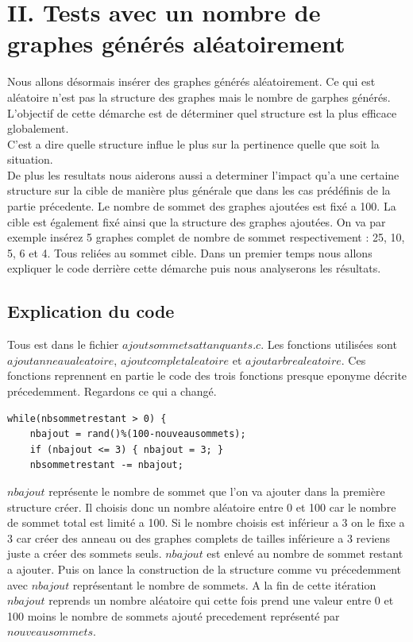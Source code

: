 \documentclass[a4paper,11pt]{article}
\begin{document}
\section{II.	Tests avec un nombre de graphes générés aléatoirement}
	Nous allons désormais insérer des graphes générés aléatoirement. Ce qui est aléatoire n'est pas la structure des graphes mais le nombre de garphes générés.\\
	L'objectif de cette démarche est de déterminer quel structure est la plus efficace globalement.\\
	C'est a dire quelle structure influe le plus sur la pertinence quelle que soit la situation.\\
	De plus les resultats nous aiderons aussi a determiner l'impact qu'a une certaine structure sur la cible de manière plus générale 
	que dans les cas prédéfinis de la partie précedente.
	Le nombre de sommet des graphes ajoutées est fixé a 100.
	La cible est également fixé ainsi que la structure des graphes ajoutées.
	On va par exemple insérez 5 graphes complet de nombre de sommet respectivement : 25, 10, 5, 6 et 4. Tous reliées au sommet cible.
	Dans un premier temps nous allons expliquer le code derrière cette démarche puis nous analyserons les résultats.

	\subsection{Explication du code}
		Tous est dans le fichier $ajoutsommetsattanquants.c$. Les fonctions utilisées sont $ajoutanneaualeatoire$, $ajoutcompletaleatoire$
		et $ajoutarbrealeatoire$. Ces fonctions reprennent en partie le code des trois fonctions presque eponyme décrite précedemment.
		Regardons ce qui a changé. 
		\begin{lstlisting}
while(nbsommetrestant > 0) {
	nbajout = rand()%(100-nouveausommets);
	if (nbajout <= 3) { nbajout = 3; }
	nbsommetrestant -= nbajout;
		\end{lstlisting}
		$nbajout$ représente le nombre de sommet que l'on va ajouter dans la première structure créer. Il choisis donc un nombre 
		aléatoire entre 0 et 100 car le nombre de sommet total est limité a 100. Si le nombre choisis est inférieur a 3 on le fixe a 3 car créer
		des anneau ou des graphes complets de tailles inférieure a 3 reviens juste a créer des sommets seuls.
		$nbajout$ est enlevé au nombre de sommet restant a ajouter. Puis on lance la construction de la structure comme vu précedemment 
		avec $nbajout$ représentant le nombre de sommets. A la fin de cette itération $nbajout$ reprends un nombre aléatoire qui cette fois
		prend une valeur entre 0 et 100 moins le nombre de sommets ajouté precedement représenté par $nouveausommets$.
\end{document}
